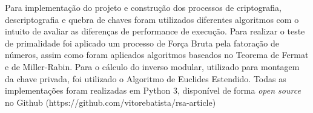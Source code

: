 Para implementação do projeto e construção dos processos de criptografia, descriptografia e quebra de chaves foram utilizados diferentes algoritmos com o intuito de avaliar as diferenças de performance de execução. Para realizar o teste de primalidade foi aplicado um processo de Força Bruta pela fatoração de números, assim como foram aplicados algoritmos baseados no Teorema de Fermat e de Miller-Rabin. Para o cálculo do inverso modular, utilizado para montagem da chave privada, foi utilizado o Algoritmo de Euclides Estendido. Todas as implementações foram realizadas em Python 3, disponível de forma \textit{open source} no Github (https://github.com/vitorebatista/rsa-article)



